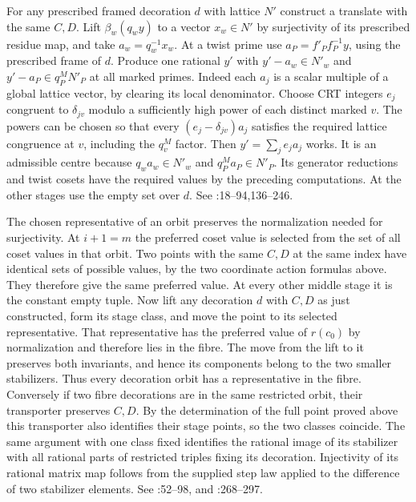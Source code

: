 For any prescribed framed decoration $d$ with lattice $N'$ construct
a translate with the same $C,D$. Lift $\beta_w(q_w y)$ to a vector
$x_w\in N'$ by surjectivity of its prescribed residue map, and take
$a_w=q_w^{-1}x_w$. At a twist prime use
$a_P=f'_P f_P^{-1}y$, using the prescribed frame of $d$.
Produce one rational $y'$ with $y'-a_w\in N'_w$ and
$y'-a_P\in q_P^M N'_P$ at all marked primes. Indeed each $a_j$
is a scalar multiple of a global lattice vector, by clearing its
local denominator. Choose CRT integers $e_j$ congruent to
$\delta_{jv}$ modulo a sufficiently high power of each distinct
marked $v$. The powers can be chosen so that every
$(e_j-\delta_{jv})a_j$ satisfies the required lattice congruence
at $v$, including the $q_v^M$ factor. Then $y'=\sum_j e_j a_j$ works.
It is an admissible centre because $q_w a_w\in N'_w$ and
$q_P^M a_P\in N'_P$. Its generator reductions and twist cosets
have the required values by the preceding computations.
At the other stages use the empty set over $d$.
See :18--94,136--246.

The chosen representative of an orbit preserves the normalization
needed for surjectivity. At $i+1=m$ the preferred coset value is
selected from the set of all coset values in that orbit. Two points
with the same $C,D$ at the same index have identical sets of possible
values, by the two coordinate action formulas above. They therefore
give the same preferred value. At every other middle stage it is
the constant empty tuple. Now lift any decoration $d$ with $C,D$
as just constructed, form its stage class, and move the point to
its selected representative. That representative has the preferred
value of $r(c_0)$ by normalization and therefore lies in the fibre.
The move from the lift to it preserves both invariants, and hence
its components belong to the two smaller stabilizers. Thus every
decoration orbit has a representative in the fibre. Conversely if
two fibre decorations are in the same restricted orbit, their
transporter preserves $C,D$. By the determination of the full point
proved above this transporter also identifies their stage points,
so the two classes coincide. The same argument with one class fixed
identifies the rational image of its stabilizer with all rational
parts of restricted triples fixing its decoration. Injectivity of
its rational matrix map follows from the supplied step law applied
to the difference of two stabilizer elements. See
:52--98,
 and
:268--297.

